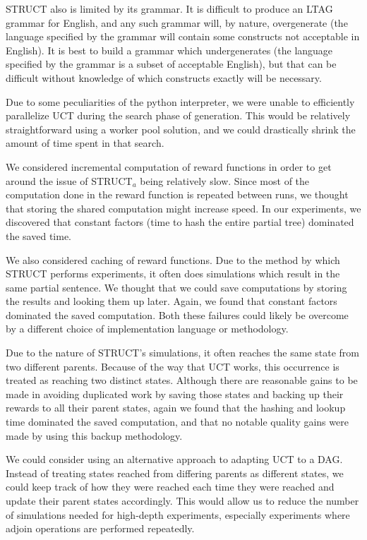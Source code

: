 STRUCT also is limited by its grammar.  It is difficult to produce an LTAG grammar
for English, and any such grammar will, by nature, overgenerate (the language
specified by the grammar will contain some constructs not acceptable in
English).  It is best to build a grammar which undergenerates (the language
specified by the grammar is a subset of acceptable English), but that can
be difficult without knowledge of which constructs exactly will be necessary.

Due to some peculiarities of the python interpreter, we were unable to
efficiently parallelize UCT during the search phase of generation.  This
would be relatively straightforward using a worker pool solution, and we
could drastically shrink the amount of time spent in that search.

We considered incremental computation of reward functions in order
to get around the issue of STRUCT$_a$ being relatively slow.  Since most
of the computation done in the reward function is repeated between runs,
we thought that storing the shared computation might increase speed.  In
our experiments, we discovered that constant factors (time to hash the entire
partial tree) dominated the saved time.

We also considered caching of reward functions.  Due to the method by
which STRUCT performs experiments, it often does simulations which result
in the same partial sentence.  We thought that we could save computations
by storing the results and looking them up later.  Again, we found that
constant factors dominated the saved computation.  Both these failures could
likely be overcome by a different choice of implementation language or
methodology.

Due to the nature of STRUCT's simulations, it often reaches the same state
from two different parents.  Because of the way that UCT works, this occurrence is
treated as reaching two distinct states.  Although there are reasonable gains to be
made in avoiding duplicated work by saving those states and backing up their rewards to
all their parent states, again we found that the
hashing and lookup time dominated the saved computation, and that no notable quality
gains were made by using this backup methodology.

We could consider using an alternative approach to adapting UCT to a DAG.  Instead
of treating states reached from differing parents as different states, we could keep
track of how they were reached each time they were reached and update their parent
states accordingly.  This would allow us to reduce the number of simulations needed
for high-depth experiments, especially experiments where adjoin operations are
performed repeatedly.

